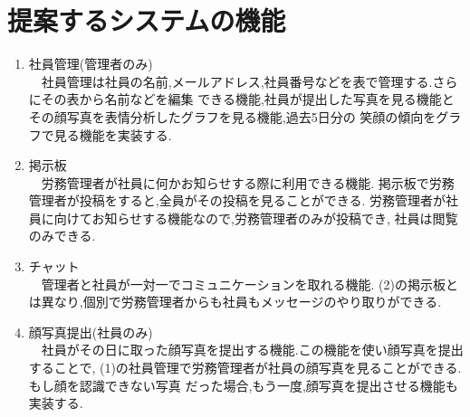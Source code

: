 \section{提案するシステムの機能}
\label{sec:chart_admin}

\renewcommand{\labelenumi}{(\arabic{enumi})}

\begin{enumerate}
  \item 社員管理(管理者のみ) \\
  　社員管理は社員の名前,メールアドレス,社員番号などを表で管理する.さらにその表から名前などを編集
  できる機能,社員が提出した写真を見る機能とその顔写真を表情分析したグラフを見る機能,過去5日分の
  笑顔の傾向をグラフで見る機能を実装する.  \\

  \item 掲示板 \\
  　労務管理者が社員に何かお知らせする際に利用できる機能.
  掲示板で労務管理者が投稿をすると,全員がその投稿を見ることができる.
  労務管理者が社員に向けてお知らせする機能なので,労務管理者のみが投稿でき,
  社員は閲覧のみできる. \\

  \item チャット \\
  　管理者と社員が一対一でコミュニケーションを取れる機能.
  (2)の掲示板とは異なり,個別で労務管理者からも社員もメッセージのやり取りができる. \\

  \item  顔写真提出(社員のみ) \\
  　社員がその日に取った顔写真を提出する機能.この機能を使い顔写真を提出することで,
  (1)の社員管理で労務管理者が社員の顔写真を見ることができる.もし顔を認識できない写真
  だった場合,もう一度,顔写真を提出させる機能も実装する.
\end{enumerate}

